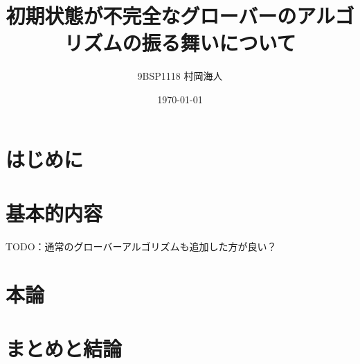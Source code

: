 \documentclass[platex,dvipdfmx, titlepage]{jlreq}			%
\title{初期状態が不完全なグローバーのアルゴリズムの振る舞いについて}
\author{9BSP1118 村岡海人}
\date{\today}
\begin{document}
\maketitle
\tableofcontents
\clearpage

\makeatletter
\renewcommand{\theequation}{%
\thesection.\arabic{equation}}
\makeatother

\section{はじめに}


\section{基本的内容}

TODO：通常のグローバーアルゴリズムも追加した方が良い？

\section{本論}



\section{まとめと結論}






\end{document}
